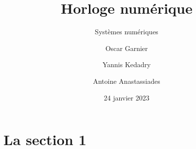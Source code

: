 \documentclass{beamer}
\title{Horloge numérique}
\subtitle{Systèmes numériques}
\author{Oscar Garnier \and Yannis Kedadry \and Antoine Anastassiades}
\institute{\'Ecole Normale Supérieure -- Département d'Informatique}
\date{24 janvier 2023}
\begin{document}
	\frame{\titlepage}

	\section{La section 1}
	\begin{frame}
		
	\end{frame}
\end{document}
